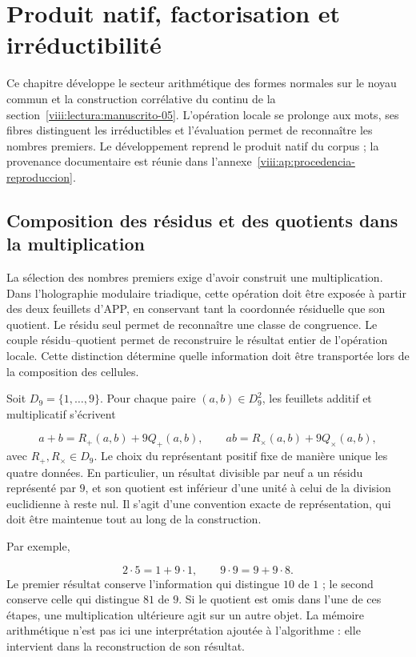 \section{Produit natif, factorisation et irréductibilité}
\label{viii:lectura:manuscrito-01}
Ce chapitre développe le secteur arithmétique des formes normales sur le noyau commun et la construction corrélative du continu de la section~\ref{viii:lectura:manuscrito-05}. L'opération locale se prolonge aux mots, ses fibres distinguent les irréductibles et l'évaluation permet de reconnaître les nombres premiers. Le développement reprend le produit natif du corpus ; la provenance documentaire est réunie dans l'annexe~\ref{viii:ap:procedencia-reproduccion}.

\subsection{Composition des résidus et des quotients dans la multiplication}
La sélection des nombres premiers exige d'avoir construit une multiplication. Dans l'holographie modulaire triadique, cette opération doit être exposée à partir des deux feuillets d'APP, en conservant tant la coordonnée résiduelle que son quotient. Le résidu seul permet de reconnaître une classe de congruence. Le couple résidu–quotient permet de reconstruire le résultat entier de l'opération locale. Cette distinction détermine quelle information doit être transportée lors de la composition des cellules.

Soit $D_9=\{1,\ldots,9\}$. Pour chaque paire $(a,b)\in D_9^2$, les feuillets additif et multiplicatif s'écrivent

\[
a+b=R_+(a,b)+9Q_+(a,b),\qquad
ab=R_\times(a,b)+9Q_\times(a,b),
\]
avec $R_+,R_\times\in D_9$. Le choix du représentant positif fixe de manière unique les quatre données. En particulier, un résultat divisible par neuf a un résidu représenté par $9$, et son quotient est inférieur d'une unité à celui de la division euclidienne à reste nul. Il s'agit d'une convention exacte de représentation, qui doit être maintenue tout au long de la construction.

Par exemple,

\[
2\cdot5=1+9\cdot1,\qquad 9\cdot9=9+9\cdot8.
\]
Le premier résultat conserve l'information qui distingue $10$ de $1$ ; le second conserve celle qui distingue $81$ de $9$. Si le quotient est omis dans l'une de ces étapes, une multiplication ultérieure agit sur un autre objet. La mémoire arithmétique n'est pas ici une interprétation ajoutée à l'algorithme : elle intervient dans la reconstruction de son résultat.

